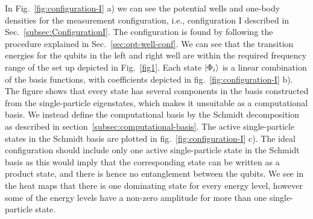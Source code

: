 \documentclass[twocolumn,superscriptaddress,unsortedaddress,
 amsmath,amssymb,
 aps,
]{revtex4-2}
\begin{document}
In Fig.~\ref{fig:configuration-I} a) %
we can see the potential wells and one-body densities for the measurement configuration, i.e., configuration I described in Sec.~\ref{subsec:ConfigurationI}. The configuration is found by following the procedure explained in Sec.~\ref{sec:opt-well-conf}. We can see that the transition energies for the qubits in the left and right well are within the required frequency range of the set up depicted in Fig.~\ref{fig1}. Each state $\ket{\Phi_i}$ is a linear combination of the basis functions, with coefficients depicted in fig.~\ref{fig:configuration-I} b). The figure shows that every state has several components in the basis constructed from the single-particle eigenstates, which makes it unsuitable as a computational basis. We instead define the computational basis by the Schmidt decomposition as described in section~\ref{subsec:computational-basis}. The active single-particle states in the Schmidt basis are plotted in fig.~\ref{fig:configuration-I} c). The ideal configuration should include only one active single-particle state in the Schmidt basis as this would imply that the corresponding state can be written as a product state, and there is hence no entanglement between the qubits. We see in the heat maps that there is one dominating state for every energy level, however some of the energy levels have a non-zero amplitude for more than one single-particle state.
\end{document}
